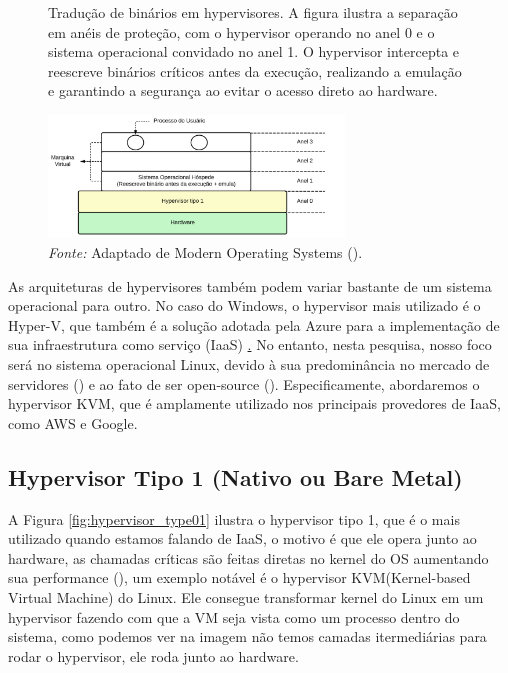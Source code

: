 \begin{figure}[htbp]
  \centering
  \caption{Tradução de binários em hypervisores. A figura ilustra a separação em anéis de proteção, com o hypervisor operando no anel 0 e o sistema operacional convidado no anel 1. O hypervisor intercepta e reescreve binários críticos antes da execução, realizando a emulação e garantindo a segurança ao evitar o acesso direto ao hardware.}
  \includegraphics[width=0.7\textwidth]{images/BinaryTranslate.png}
  \caption*{\textit{Fonte:} Adaptado de Modern Operating Systems (\cite{modernOS}).}
  \label{fig:binary_translate}
\end{figure}


As arquiteturas de hypervisores também podem variar bastante de um sistema operacional para outro. No caso do Windows, o hypervisor mais utilizado é o Hyper-V, que também é a solução adotada pela Azure para a implementação de sua infraestrutura como serviço (IaaS) \href{https://learn.microsoft.com/pt-br/azure/architecture/reference-architectures/n-tier/high-security-iaas}. No entanto, nesta pesquisa, nosso foco será no sistema operacional Linux, devido à sua predominância no mercado de servidores (\cite{OperationSystemMarketVolume}) e ao fato de ser open-source (\cite{WhyUseLinux}). Especificamente, abordaremos o hypervisor KVM, que é amplamente utilizado nos principais provedores de IaaS, como AWS e Google.


\subsection{Hypervisor Tipo 1 (Nativo ou Bare Metal)}

A Figura \ref{fig:hypervisor_type01} ilustra o hypervisor tipo 1, que é o mais utilizado quando estamos falando de IaaS, o motivo é que ele opera junto ao hardware, as chamadas críticas são feitas diretas no kernel do OS aumentando sua performance (\cite{chirammal2016mastering}), um exemplo notável é o hypervisor KVM(Kernel-based Virtual Machine) do Linux. Ele consegue transformar kernel do Linux em um hypervisor fazendo com que a VM seja vista como um processo dentro do sistema, como podemos ver na imagem não temos camadas itermediárias para rodar o hypervisor, ele roda junto ao hardware.


